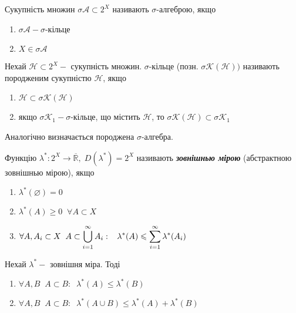 \begin{definition}
    Сукупність множин $\sigma \mathcal{A} \subset 2^X$ називають $\sigma$-алгеброю, якщо
    \begin{enumerate}
        \item $\sigma \mathcal{A} - \sigma$-кільце
        \item $X \in \sigma \mathcal{A}$
    \end{enumerate}
\end{definition}


\begin{definition}
   Нехай $\mathcal{H} \subset 2^X-$ сукупність множин. $\sigma$-кільце (позн. $\sigma \mathcal{K}(\mathcal{H}))$ називають породженим сукупністю $\mathcal{H}$, якщо
    \begin{enumerate}
        \item $\mathcal{H} \subset \sigma \mathcal{K}(\mathcal{H}) $
        \item якщо $\sigma \mathcal{K}_1-\sigma$-кільце, що містить $\mathcal{H}$, то $\sigma \mathcal{K}(\mathcal{H}) \subset \sigma \mathcal{K}_1$ 
    \end{enumerate}
\end{definition}
Аналогічно визначається породжена $\sigma$-алгебра.
\begin{definition}
   Функцію  $\lambda^*: 2^X \rightarrow \mathbb{\overline{R}}, \; D(\lambda^*) = 2^X $ називають \textcolor{NavyBlue}{\textbf{\textit{зовнішнью мірою}}} (абстрактною зовнішнью мірою), якщо
    \begin{enumerate}
        \item $\lambda^*(\varnothing) = 0 $
        \item $\lambda^*(A) \geqslant 0 \;\; \forall A \subset X$
        \item $\forall A, A_i \subset X \;\; A \subset \displaystyle\bigcup\limits_{i = 1}^{\infty} A_i: \;\;\; \lambda^*(A) \leqslant \displaystyle\sum\limits_{i=1}^{\infty} \lambda^*(A_i)$
    \end{enumerate}
\end{definition}

\begin{theorem}
    Нехай $\lambda^*-$ зовнішня міра. Тоді
     \begin{enumerate}
        \item $\forall A, B \;\; A \subset B:\;\; \lambda^*(A) \leqslant \lambda^*(B)$
        \item $\forall A, B \;\; A \subset B:\;\; \lambda^*(A \cup B) \leqslant \lambda^*(A) + \lambda^*(B)$
    \end{enumerate}
\end{theorem}

